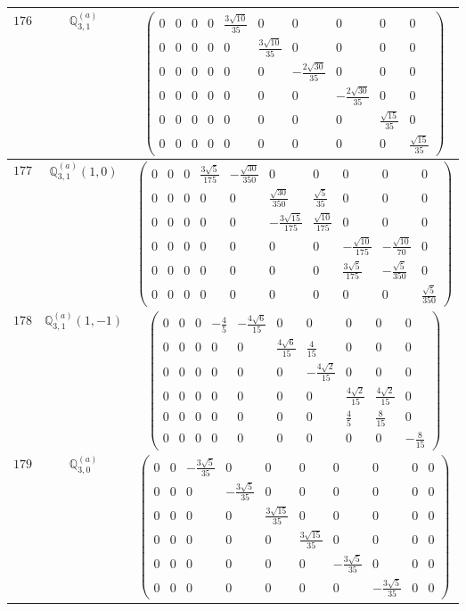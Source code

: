 \documentclass[fleqn,8pt,landscape]{jsarticle}
\begin{document}
\begin{center}
\begin{longtable}{ccc}
$ 176 $ & $ \mathbb{Q}_{3,1}^{(a)} $ & $ \begin{pmatrix} 0 & 0 & 0 & 0 & \frac{3 \sqrt{10}}{35} & 0 & 0 & 0 & 0 & 0 \\ 0 & 0 & 0 & 0 & 0 & \frac{3 \sqrt{10}}{35} & 0 & 0 & 0 & 0 \\ 0 & 0 & 0 & 0 & 0 & 0 & - \frac{2 \sqrt{30}}{35} & 0 & 0 & 0 \\ 0 & 0 & 0 & 0 & 0 & 0 & 0 & - \frac{2 \sqrt{30}}{35} & 0 & 0 \\ 0 & 0 & 0 & 0 & 0 & 0 & 0 & 0 & \frac{\sqrt{15}}{35} & 0 \\ 0 & 0 & 0 & 0 & 0 & 0 & 0 & 0 & 0 & \frac{\sqrt{15}}{35} \end{pmatrix} $ \\ \hline
$ 177 $ & $ \mathbb{Q}_{3,1}^{(a)}(1,0) $ & $ \begin{pmatrix} 0 & 0 & 0 & \frac{3 \sqrt{5}}{175} & - \frac{\sqrt{30}}{350} & 0 & 0 & 0 & 0 & 0 \\ 0 & 0 & 0 & 0 & 0 & \frac{\sqrt{30}}{350} & \frac{\sqrt{5}}{35} & 0 & 0 & 0 \\ 0 & 0 & 0 & 0 & 0 & - \frac{3 \sqrt{15}}{175} & \frac{\sqrt{10}}{175} & 0 & 0 & 0 \\ 0 & 0 & 0 & 0 & 0 & 0 & 0 & - \frac{\sqrt{10}}{175} & - \frac{\sqrt{10}}{70} & 0 \\ 0 & 0 & 0 & 0 & 0 & 0 & 0 & \frac{3 \sqrt{5}}{175} & - \frac{\sqrt{5}}{350} & 0 \\ 0 & 0 & 0 & 0 & 0 & 0 & 0 & 0 & 0 & \frac{\sqrt{5}}{350} \end{pmatrix} $ \\ \hline
$ 178 $ & $ \mathbb{Q}_{3,1}^{(a)}(1,-1) $ & $ \begin{pmatrix} 0 & 0 & 0 & - \frac{4}{5} & - \frac{4 \sqrt{6}}{15} & 0 & 0 & 0 & 0 & 0 \\ 0 & 0 & 0 & 0 & 0 & \frac{4 \sqrt{6}}{15} & \frac{4}{15} & 0 & 0 & 0 \\ 0 & 0 & 0 & 0 & 0 & 0 & - \frac{4 \sqrt{2}}{15} & 0 & 0 & 0 \\ 0 & 0 & 0 & 0 & 0 & 0 & 0 & \frac{4 \sqrt{2}}{15} & \frac{4 \sqrt{2}}{15} & 0 \\ 0 & 0 & 0 & 0 & 0 & 0 & 0 & \frac{4}{5} & \frac{8}{15} & 0 \\ 0 & 0 & 0 & 0 & 0 & 0 & 0 & 0 & 0 & - \frac{8}{15} \end{pmatrix} $ \\ \hline
$ 179 $ & $ \mathbb{Q}_{3,0}^{(a)} $ & $ \begin{pmatrix} 0 & 0 & - \frac{3 \sqrt{5}}{35} & 0 & 0 & 0 & 0 & 0 & 0 & 0 \\ 0 & 0 & 0 & - \frac{3 \sqrt{5}}{35} & 0 & 0 & 0 & 0 & 0 & 0 \\ 0 & 0 & 0 & 0 & \frac{3 \sqrt{15}}{35} & 0 & 0 & 0 & 0 & 0 \\ 0 & 0 & 0 & 0 & 0 & \frac{3 \sqrt{15}}{35} & 0 & 0 & 0 & 0 \\ 0 & 0 & 0 & 0 & 0 & 0 & - \frac{3 \sqrt{5}}{35} & 0 & 0 & 0 \\ 0 & 0 & 0 & 0 & 0 & 0 & 0 & - \frac{3 \sqrt{5}}{35} & 0 & 0 \end{pmatrix} $ \\ \hline

\end{longtable}
\end{center}
\end{document}
